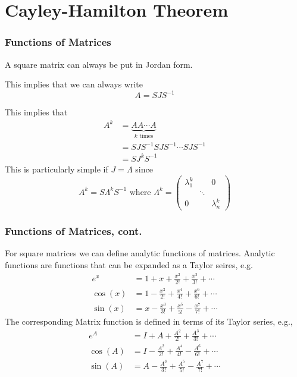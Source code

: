 \documentclass{beamer}
\begin{document}
\section{Cayley-Hamilton Theorem}
\frame{\sectionpage}


\begin{frame}\frametitle{Functions of Matrices}
	\begin{lemma}
	A square matrix can always be put in Jordan form.	
	\end{lemma}
	This implies that we can always write
	\[ 
		A = SJS^{-1} 
	\]
	
	This implies that 
	\begin{align*}
		A^k &= \underbrace{AA\cdots A}_{k\text{ times}} \\
		    &= SJS^{-1}SJS^{-1}\cdots SJS^{-1} \\
		    &= SJ^kS^{-1} 
	\end{align*}
	This is particularly simple if $J = \Lambda$ since 
	\[ 
		A^k = S\Lambda^kS^{-1} 
		\text{ where } 
		\Lambda^k 
			= \begin{pmatrix}
	    		\lambda_1^k & & 0\\
	    		& \ddots \\
	    		0 & & \lambda_n^k
	  		  \end{pmatrix} 
	\]	
\end{frame}

\begin{frame}\frametitle{Functions of Matrices, cont.}
	For square matrices we can define analytic functions of matrices.
	Analytic functions are functions that can be expanded as a Taylor
	seires, e.g.
	\begin{align*}
		e^x &= 1 + x + \frac{x^2}{2!} + \frac{x^3}{3!} + \cdots \\
		\cos(x) &= 1 - \frac{x^2}{2!} + \frac{x^4}{4!} + \frac{x^6}{6!} + \cdots \\
		\sin(x) &= x - \frac{x^3}{3!} + \frac{x^5}{5!} - \frac{x^7}{7!} + \cdots 
	\end{align*}
	The corresponding Matrix function is defined in terms of its Taylor
	series, e.g.,
	\begin{align*}
		e^A &= I + A + \frac{A^2}{2!} + \frac{A^3}{3!} + \cdots\\
		\cos(A) &= I - \frac{A^2}{2!} + \frac{A^4}{4!} - \frac{A^6}{6!} + \cdots\\
		\sin(A) &= A - \frac{A^3}{3!} + \frac{A^5}{5!} - \frac{A^7}{7!} + \cdots
	\end{align*}

\end{frame}
\end{document}
